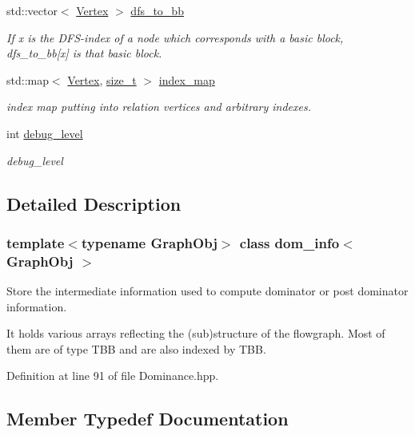 \begin{DoxyCompactItemize}
std\+::vector$<$ \hyperlink{classdom__info_a5e4ca21e2c5281bdbb95d2c8d965c9be}{Vertex} $>$ \hyperlink{classdom__info_a082a53aee1546ad2eacc3424402a037c}{dfs\+\_\+to\+\_\+bb}
\begin{DoxyCompactList}\small\item\em If x is the D\+F\+S-\/index of a node which corresponds with a basic block, dfs\+\_\+to\+\_\+bb\mbox{[}x\mbox{]} is that basic block. \end{DoxyCompactList}\item 
std\+::map$<$ \hyperlink{classdom__info_a5e4ca21e2c5281bdbb95d2c8d965c9be}{Vertex}, \hyperlink{tutorial__fpt__2017_2intro_2sixth_2test_8c_a7c94ea6f8948649f8d181ae55911eeaf}{size\+\_\+t} $>$ \hyperlink{classdom__info_aedfb2f00293356e11a413f995e1063b8}{index\+\_\+map}
\begin{DoxyCompactList}\small\item\em index map putting into relation vertices and arbitrary indexes. \end{DoxyCompactList}\item 
int \hyperlink{classdom__info_a96e7f51bbd82708f40ca4d783bcbb5de}{debug\+\_\+level}
\begin{DoxyCompactList}\small\item\em debug\+\_\+level \end{DoxyCompactList}\end{DoxyCompactItemize}


\subsection{Detailed Description}
\subsubsection*{template$<$typename Graph\+Obj$>$\newline
class dom\+\_\+info$<$ Graph\+Obj $>$}

Store the intermediate information used to compute dominator or post dominator information. 

It holds various arrays reflecting the (sub)structure of the flowgraph. Most of them are of type T\+BB and are also indexed by T\+BB. 

Definition at line 91 of file Dominance.\+hpp.



\subsection{Member Typedef Documentation}
\mbox{\label{classdom__info_a61a309b17126a4b52e28adc4b6d1b45a}} 
